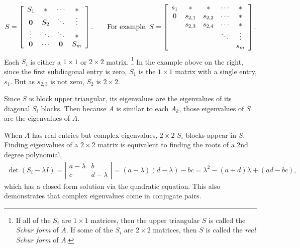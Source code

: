 \[
S =
\left[\begin{array}{cccc}
S_1    & *      & \cdots & *      \\
\0     & S_2    & \ddots & \vdots \\
\vdots & \ddots & \ddots & *      \\
\0     & \cdots &     \0 & S_m
\end{array}\right].
\qquad
\text{For example,}\ S =
\left[\begin{array}{ccccc}
\arrayrulecolor{lightgray}
s_1 & *       & *       & \cdots & *      \\
0   & s_{2,1} & s_{2,2} & \cdots & *      \\
    & s_{2,3} & s_{2,4} & \cdots & *      \\
    &         &         & \ddots & \vdots \\
    &         &         &        & s_m    \\
\end{array}\right].
\]
Each $S_i$ is either a $1\times1$ or $2\times2$ matrix.%
\footnote{If all of the $S_i$ are $1\times1$ matrices, then the upper triangular $S$ is called the \emph{Schur form} of $A$.
If some of the $S_i$ are $2\times2$ matrices, then $S$ is called the \emph{real Schur form} of $A$.}
In the example above on the right, since the first subdiagonal entry is zero, $S_1$ is the $1\times 1$ matrix with a single entry, $s_1$.
But as $s_{2,3}$ is not zero, $S_2$ is $2\times 2$.

Since $S$ is block upper triangular, its eigenvalues are the eigenvalues of its diagonal $S_i$ blocks.
Then because $A$ is similar to each $A_k$, those eigenvalues of $S$ are the eigenvalues of $A$.


When $A$ has real entries but complex eigenvalues, $2 \times 2$ $S_i$ blocks appear in $S$.
Finding eigenvalues of a $2 \times 2$ matrix is equivalent to finding the roots of a 2nd degree polynomial,
\begin{align}
\det(S_i - \lambda I) =
\left|\begin{array}{cc}
a - \lambda & b           \\
c           & d - \lambda
\end{array}\right|
= (a - \lambda)(d - \lambda) - bc
= \lambda^2 - (a+d)\lambda + (ad - bc),
\label{eq:qr-algorithm-roots}
\end{align}
which has a closed form solution via the quadratic equation.
This also demonstrates that complex eigenvalues come in conjugate pairs.

